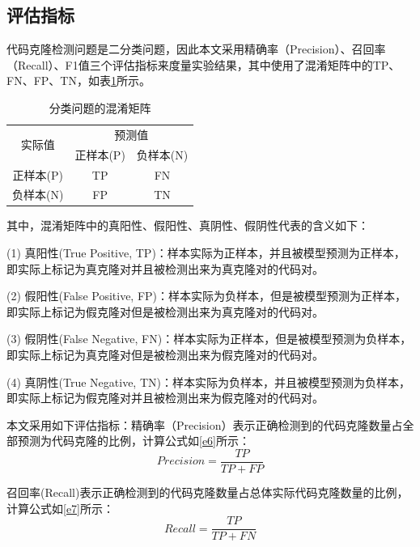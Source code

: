 \subsection{评估指标}
\label{subsec:Index}
代码克隆检测问题是二分类问题，因此本文采用精确率（Precision）、召回率（Recall）、F1值三个评估指标来度量实验结果，其中使用了混淆矩阵中的TP、FN、FP、TN，如表\ref{tab:ConfusionMatrix}所示。

\begin{table}[htp]
  \centering
  \caption{分类问题的混淆矩阵} 
  \label{tab:ConfusionMatrix}
  \renewcommand{\arraystretch}{1.1}
  \begin{tabular*}{0.7\textwidth}{@{\extracolsep{\fill}}ccc}
  \toprule
  \multirow{2}{*}{实际值} & \multicolumn{2}{c}{预测值} \\
  \cmidrule{2-3} 
  \multirow{2}{*}{} & 正样本(P) & 负样本(N) \\
  \midrule
    正样本(P)			&TP	  &FN		 \\
    负样本(N)			&FP		&TN		 \\
  \bottomrule
  \end{tabular*}
\end{table}

其中，混淆矩阵中的真阳性、假阳性、真阴性、假阴性代表的含义如下：

(1) 真阳性(True Positive, TP)：样本实际为正样本，并且被模型预测为正样本，即实际上标记为真克隆对并且被检测出来为真克隆对的代码对。
 
(2) 假阳性(False Positive, FP)：样本实际为负样本，但是被模型预测为正样本，即实际上标记为假克隆对但是被检测出来为真克隆对的代码对。
 
(3) 假阴性(False Negative, FN)：样本实际为正样本，但是被模型预测为负样本，即实际上标记为真克隆对但是被检测出来为假克隆对的代码对。
 
(4) 真阴性(True Negative, TN)：样本实际为负样本，并且被模型预测为负样本，即实际上标记为假克隆对并且被检测出来为假克隆对的代码对。

本文采用如下评估指标：精确率（Precision）表示正确检测到的代码克隆数量占全部预测为代码克隆的比例，计算公式如\ref{e6}所示：
\begin{equation}\label{e6}
  Precision = \frac{TP}{TP+FP} 
\end{equation}

召回率(Recall)表示正确检测到的代码克隆数量占总体实际代码克隆数量的比例，计算公式如\ref{e7}所示：
\begin{equation}\label{e7}
  Recall = \frac{TP}{TP+FN} 
\end{equation}

